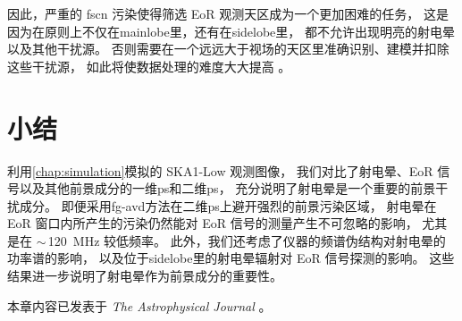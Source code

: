 因此，严重的 \ac{fscn} 污染使得筛选 EoR 观测天区成为一个更加困难的任务，
这是因为在原则上不仅在\ac{mainlobe}里，还有在\ac{sidelobe}里，
都不允许出现明亮的射电晕以及其他干扰源。
否则需要在一个远远大于视场的天区里准确识别、建模并扣除这些干扰源，
如此将使数据处理的难度大大提高 \cite{pober2013,pober2016}。


\section{小结}

利用\autoref{chap:simulation}模拟的 SKA1-Low 观测图像，
我们对比了射电晕、EoR 信号以及其他前景成分的一维\ac{ps}和二维\ac{ps}，
充分说明了射电晕是一个重要的前景干扰成分。
即便采用\ac{fg-avd}方法在二维\ac{ps}上避开强烈的前景污染区域，
射电晕在 EoR 窗口内所产生的污染仍然能对 EoR 信号的测量产生不可忽略的影响，
尤其是在 $\sim$\,\SI{120}{\MHz} 较低频率。
此外，我们还考虑了仪器的频谱伪结构对射电晕的功率谱的影响，
以及位于\ac{sidelobe}里的射电晕辐射对 EoR 信号探测的影响。
这些结果进一步说明了射电晕作为前景成分的重要性。

本章内容已发表于 \textit{The Astrophysical Journal} \cite{li.halo}。


